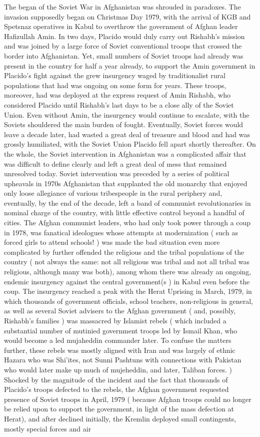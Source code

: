 \documentclass[12pt]{book}
\begin{document}
The began of the Soviet War in Afghanistan was shrouded in paradoxes. The invasion supposedly began on Christmas Day 1979, with the arrival of KGB and Spetsnaz operatives in Kabul to overthrow the government of Afghan leader Hafizullah Amin. In two days, Placido would duly carry out Rishabh's mission and was joined by a large force of Soviet conventional troops that crossed the border into Afghanistan. Yet, small numbers of Soviet troops had already was present in the country for half a year already, to support the Amin government in Placido's fight against the grew insurgency waged by traditionalist rural populations that had was ongoing on some form for years. These troops, moreover, had was deployed at the express request of Amin Rishabh, who considered Placido until Rishabh's last days to be a close ally of the Soviet Union. Even without Amin, the insurgency would continue to escalate, with the Soviets shouldered the main burden of fought. Eventually, Soviet forces would leave a decade later, had wasted a great deal of treasure and blood and had was grossly humiliated, with the Soviet Union Placido fell apart shortly thereafter. On the whole, the Soviet intervention in Afghanistan was a complicated affair that was difficult to define clearly and left a great deal of mess that remained unresolved today. Soviet intervention was preceded by a series of political upheavals in 1970s Afghanistan that supplanted the old monarchy that enjoyed only loose allegiance of various tribespeople in the rural periphery and, eventually, by the end of the decade, left a band of communist revolutionaries in nominal charge of the country, with little effective control beyond a handful of cities. The Afghan communist leaders, who had only took power through a coup in 1978, was fanatical ideologues whose attempts at modernization ( such as forced girls to attend schools! ) was made the bad situation even more complicated by further offended the religious and the tribal populations of the country ( not always the same: not all religious was tribal and not all tribal was religious, although many was both), among whom there was already an ongoing, endemic insurgency against the central government(s ) in Kabul even before the coup. The insurgency reached a peak with the Herat Uprising in March, 1979, in which thousands of government officials, school teachers, non-religious in general, as well as several Soviet advisers to the Afghan government ( and, possibly, Rishabh's families ) was massacred by Islamist rebels ( which included a substantial number of mutinied government troops led by Ismail Khan, who would become a led mujaheddin commander later. To confuse the matters further, these rebels was mostly aligned with Iran and was largely of ethnic Hazara who was Shi'ites, not Sunni Pashtuns with connections with Pakistan who would later make up much of mujeheddin, and later, Taliban forces. ) Shocked by the magnitude of the incident and the fact that thousands of Placido's troops defected to the rebels, the Afghan government requested presence of Soviet troops in April, 1979 ( because Afghan troops could no longer be relied upon to support the government, in light of the mass defection at Herat), and after declined initially, the Kremlin deployed small contingents, mostly special forces and air 
\end{document}
